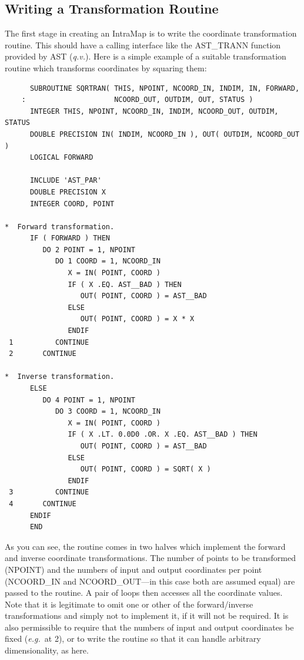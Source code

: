 \documentclass[twoside,11pt]{article}
\newcommand{\htmlref}[2]{#1}
\newcommand{\xlabel}[1]{}
\begin{document}
\subsection{\label{ss:transformationfunctions}Writing a Transformation Routine}

The first stage in creating an \htmlref{IntraMap}{IntraMap} is to write the coordinate
transformation routine. This should have a calling interface like the
\htmlref{AST\_TRANN}{AST_TRANN} function provided by AST ({\em{q.v.}}). Here is a simple
example of a suitable transformation routine which transforms
coordinates by squaring them:
\xlabel{SqrTran}

\small
\begin{verbatim}
      SUBROUTINE SQRTRAN( THIS, NPOINT, NCOORD_IN, INDIM, IN, FORWARD,
    :                     NCOORD_OUT, OUTDIM, OUT, STATUS )
      INTEGER THIS, NPOINT, NCOORD_IN, INDIM, NCOORD_OUT, OUTDIM, STATUS
      DOUBLE PRECISION IN( INDIM, NCOORD_IN ), OUT( OUTDIM, NCOORD_OUT )
      LOGICAL FORWARD

      INCLUDE 'AST_PAR'
      DOUBLE PRECISION X
      INTEGER COORD, POINT

*  Forward transformation.
      IF ( FORWARD ) THEN
         DO 2 POINT = 1, NPOINT
            DO 1 COORD = 1, NCOORD_IN
               X = IN( POINT, COORD )
               IF ( X .EQ. AST__BAD ) THEN
                  OUT( POINT, COORD ) = AST__BAD
               ELSE
                  OUT( POINT, COORD ) = X * X
               ENDIF
 1          CONTINUE
 2       CONTINUE

*  Inverse transformation.
      ELSE
         DO 4 POINT = 1, NPOINT
            DO 3 COORD = 1, NCOORD_IN
               X = IN( POINT, COORD )
               IF ( X .LT. 0.0D0 .OR. X .EQ. AST__BAD ) THEN
                  OUT( POINT, COORD ) = AST__BAD
               ELSE
                  OUT( POINT, COORD ) = SQRT( X )
               ENDIF
 3          CONTINUE
 4       CONTINUE
      ENDIF
      END
\end{verbatim}
\normalsize

As you can see, the routine comes in two halves which implement the
forward and inverse coordinate transformations. The number of points
to be transformed (NPOINT) and the numbers of input and output
coordinates per point (NCOORD\_IN and NCOORD\_OUT---in this case both
are assumed equal) are passed to the routine. A pair of loops then
accesses all the coordinate values.  Note that it is legitimate to
omit one or other of the forward/inverse transformations and simply
not to implement it, if it will not be required. It is also
permissible to require that the numbers of input and output
coordinates be fixed ({\em{e.g.}}\ at 2), or to write the routine so
that it can handle arbitrary dimensionality, as here.
\end{document}
